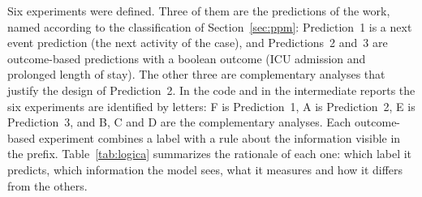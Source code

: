 Six experiments were defined. Three of them are the predictions of the work, named according to the classification of Section~\ref{sec:ppm}: Prediction~1 is a next event prediction (the next activity of the case), and Predictions~2 and~3 are outcome-based predictions with a boolean outcome (ICU admission and prolonged length of stay). The other three are complementary analyses that justify the design of Prediction~2. In the code and in the intermediate reports the six experiments are identified by letters: F is Prediction~1, A is Prediction~2, E is Prediction~3, and B, C and D are the complementary analyses. Each outcome-based experiment combines a label with a rule about the information visible in the prefix. Table~\ref{tab:logica} summarizes the rationale of each one: which label it predicts, which information the model sees, what it measures and how it differs from the others.

